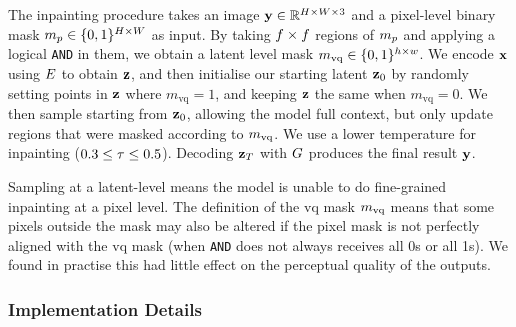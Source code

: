 The inpainting procedure takes an image $\mathbf{y} \in \mathbb{R}^{H \times W \times 3}$
and a pixel-level binary mask $m_p \in \{0, 1\}^{H \times W}$ as input.
By taking $f \times f$ regions of $m_p$ and
applying a logical \texttt{AND} in them, we obtain a latent level mask $m_\textrm{vq}
\in \{0,1\}^{h \times w}$. We encode $\mathbf{x}$ using $E$ to obtain
$\mathbf{z}$, and then initialise our starting latent $\mathbf{z}_0$ by randomly
setting points in $\mathbf{z}$ where $m_\text{vq} = 1$, and keeping $\mathbf{z}$ the
same when $m_\text{vq} = 0$. We then sample starting from $\mathbf{z}_0$,
allowing the model full context, but only update regions that were masked
according to $m_\textrm{vq}$. We use a lower temperature for inpainting
($0.3 \leq \tau \leq 0.5$). Decoding $\mathbf{z}_T$ with
$G$ produces the final result $\mathbf{y}$.

Sampling at a latent-level means the model is unable to do fine-grained
inpainting at a pixel level. The definition of the \gls{vq} mask $m_\textrm{vq}$ means
that some pixels outside the mask may also be altered if the pixel mask is not
perfectly aligned with the \gls{vq} mask (when \texttt{AND} does not always
receives all 0s or all 1s). We found in practise this had little effect on the
perceptual quality of the outputs.

\subsubsection*{Implementation Details}

